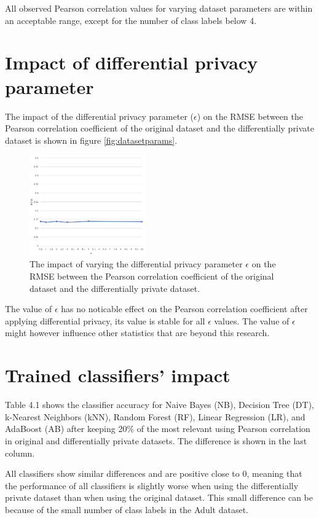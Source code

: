 All observed Pearson correlation values for varying dataset parameters are within an acceptable range, except for the number of class labels below 4.

\section{Impact of differential privacy parameter}
The impact of the differential privacy parameter ($\epsilon$) on the RMSE between the Pearson correlation coefficient of the original dataset and the differentially private dataset is shown in figure \ref{fig:datasetparams}.

\begin{figure}[H]
    \centering
    \includegraphics[width=5cm]{img/epsilon.png}
    \caption{The impact of varying the differential privacy parameter $\epsilon$ on the RMSE between the Pearson correlation coefficient of the original dataset and the differentially private dataset.}
    \label{fig:epsilonparam}
\end{figure}

The value of $\epsilon$ has no noticable effect on the Pearson correlation coefficient after applying differential privacy, its value is stable for all $\epsilon$ values. The value of $\epsilon$ might however influence other statistics that are beyond this research.

\section{Trained classifiers' impact}
Table 4.1 shows the classifier accuracy for Naive Bayes (NB), Decision Tree (DT), k-Nearest Neighbors (kNN), Random Forest (RF), Linear Regression (LR), and AdaBoost (AB) after keeping 20\% of the most relevant using Pearson correlation in original and differentially private datasets. The difference is shown in the last column.

All classifiers show similar differences and are positive close to 0, meaning that the performance of all classifiers is slightly worse when using the differentially private dataset than when using the original dataset. This small difference can be because of the small number of class labels in the Adult dataset.

